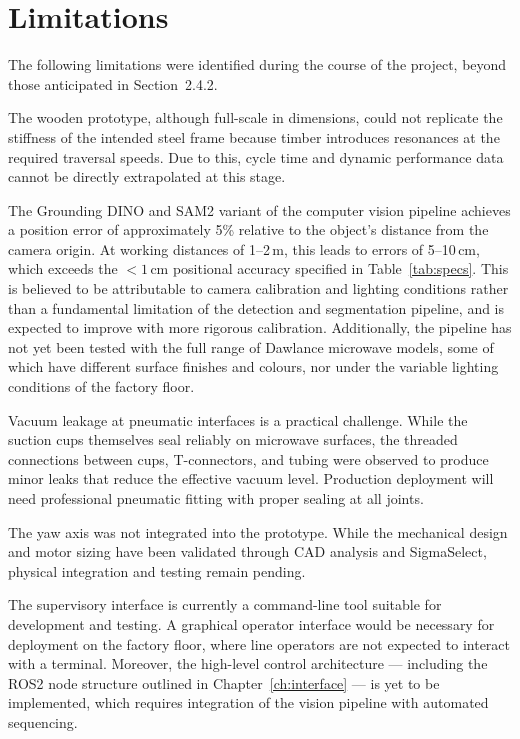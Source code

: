 \section{Limitations} \label{sec:limitations}

The following limitations were identified during the course of the project, beyond those anticipated in Section~2.4.2.

The wooden prototype, although full-scale in dimensions, could not replicate the stiffness of the intended steel frame because timber introduces resonances at the required traversal speeds. Due to this, cycle time and dynamic performance data cannot be directly extrapolated at this stage.

The Grounding DINO and SAM2 variant of the computer vision pipeline achieves a position error of approximately 5\% relative to the object's distance from the camera origin. At working distances of 1--2\,m, this leads to errors of 5--10\,cm, which exceeds the $<1$\,cm positional accuracy specified in Table~\ref{tab:specs}. This is believed to be attributable to camera calibration and lighting conditions rather than a fundamental limitation of the detection and segmentation pipeline, and is expected to improve with more rigorous calibration. Additionally, the pipeline has not yet been tested with the full range of Dawlance microwave models, some of which have different surface finishes and colours, nor under the variable lighting conditions of the factory floor.

Vacuum leakage at pneumatic interfaces is a practical challenge. While the suction cups themselves seal reliably on microwave surfaces, the threaded connections between cups, T-connectors, and tubing were observed to produce minor leaks that reduce the effective vacuum level. Production deployment will need professional pneumatic fitting with proper sealing at all joints.

The yaw axis was not integrated into the prototype. While the mechanical design and motor sizing have been validated through CAD analysis and SigmaSelect, physical integration and testing remain pending.

The supervisory interface is currently a command-line tool suitable for development and testing. A graphical operator interface would be necessary for deployment on the factory floor, where line operators are not expected to interact with a terminal. Moreover, the high-level control architecture --- including the ROS2 node structure outlined in Chapter~\ref{ch:interface} --- is yet to be implemented, which requires integration of the vision pipeline with automated sequencing.


